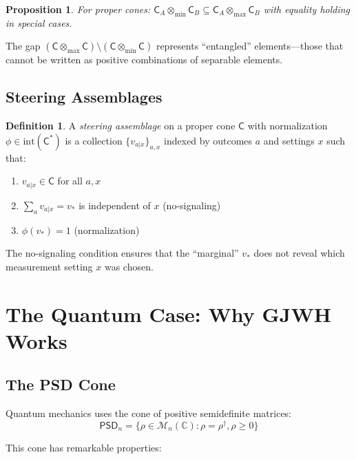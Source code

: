 \documentclass[11pt,a4paper]{article}
\newtheorem{proposition}[theorem]{Proposition}
\theoremstyle{definition}
\newtheorem{definition}[theorem]{Definition}
\newcommand{\C}{\mathsf{C}}
\newcommand{\Cstar}{\mathsf{C}^*}
\newcommand{\tmin}{\otimes_{\min}}
\newcommand{\tmax}{\otimes_{\max}}
\newcommand{\Complex}{\mathbb{C}}
\newcommand{\PSD}{\mathsf{PSD}}
\newcommand{\interior}{\mathrm{int}}
\begin{document}
\begin{proposition}
For proper cones: $\C_A \tmin \C_B \subseteq \C_A \tmax \C_B$ with equality holding in special cases.
\end{proposition}

The gap $(\C \tmax \C) \setminus (\C \tmin \C)$ represents ``entangled'' elements---those that cannot be written as positive combinations of separable elements.

\subsection{Steering Assemblages}

\begin{definition}
A \emph{steering assemblage} on a proper cone $\C$ with normalization $\phi \in \interior(\Cstar)$ is a collection $\{v_{a|x}\}_{a,x}$ indexed by outcomes $a$ and settings $x$ such that:
\begin{enumerate}[label=(\roman*)]
    \item $v_{a|x} \in \C$ for all $a, x$
    \item $\sum_a v_{a|x} = v_*$ is independent of $x$ (no-signaling)
    \item $\phi(v_*) = 1$ (normalization)
\end{enumerate}
\end{definition}

The no-signaling condition ensures that the ``marginal'' $v_*$ does not reveal which measurement setting $x$ was chosen.

\section{The Quantum Case: Why GJWH Works}

\subsection{The PSD Cone}

Quantum mechanics uses the cone of positive semidefinite matrices:
\[
\PSD_n = \{\rho \in \mathcal{M}_n(\Complex) : \rho = \rho^\dagger, \rho \geq 0\}
\]

This cone has remarkable properties:
\end{document}
